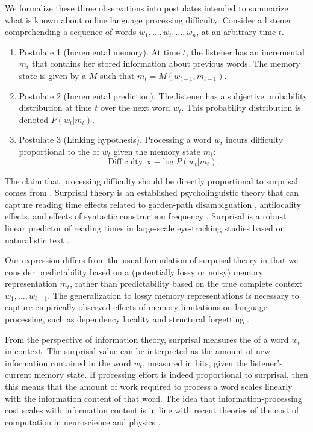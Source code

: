 We formalize these three observations into postulates intended to summarize what is known about online language processing difficulty. Consider a listener comprehending a sequence of words $w_1, \dots, w_t, \dots, w_n$, at an arbitrary time $t$.
\begin{enumerate}
    \item Postulate 1 (Incremental memory). At time $t$, the listener has an incremental  $m_t$ that contains her stored information about previous words. The memory state is given by a  $M$ such that $m_t = M(w_{t-1}, m_{t-1})$.
    \item Postulate 2 (Incremental prediction). The listener has a subjective probability distribution at time $t$ over the next word $w_t$. This probability distribution is denoted $P(w_t|m_t)$.
    \item Postulate 3 (Linking hypothesis). Processing a word $w_t$ incurs difficulty proportional to the  of $w_t$ given the memory state $m_t$:
    \begin{equation}
    \label{eq:lossy-surp}
    \text{Difficulty} \propto -\log P(w_t | m_t).
\end{equation}
\end{enumerate}
The claim that processing difficulty should be directly proportional to surprisal comes from . Surprisal theory is an established psycholinguistic theory that can capture reading time effects related to garden-path disambiguation \citep{hale2001probabilistic}, antilocality effects, and effects of syntactic construction frequency \citep{levy2008expectation}. Surprisal is a robust linear predictor of reading times in large-scale eye-tracking studies based on naturalistic text \citep{smith-effect-2013,goodkind-predictive-2018}.

Our expression differs from the usual formulation of surprisal theory in that we consider predictability based on a (potentially lossy or noisy) memory representation $m_t$, rather than predictability based on the true complete context $w_1, \dots, w_{t-1}$. The generalization to lossy memory representations is necessary to capture empirically observed effects of memory limitations on language processing, such as dependency locality and structural forgetting \citep{futrell-noisy-context-2017,futrell2019information}.

From the perspective of information theory, surprisal measures the  of a word $w_t$ in context. The surprisal value can be interpreted as the amount of new information contained in the word $w_t$, measured in bits, given the listener's current memory state. If processing effort is indeed proportional to surprisal, then this means that the amount of work required to process a word scales linearly with the information content of that word. The idea that information-processing cost scales with information content is in line with recent theories of the cost of computation in neuroscience \citep{friston2010free,zenon2019information} and physics \citep{still2012thermodynamics}. 

